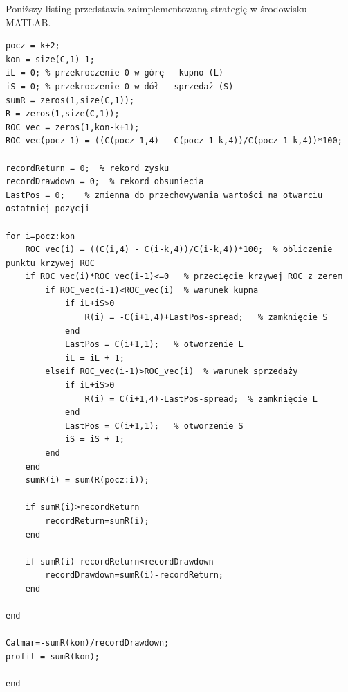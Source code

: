 \documentclass[12pt,a4paper]{article}
\begin{document}
\noindent Poniższy listing przedstawia zaimplementowaną strategię w środowisku MATLAB.
\begin{scriptsize}
\begin{lstlisting}
pocz = k+2;	
kon = size(C,1)-1;
iL = 0; % przekroczenie 0 w górę - kupno (L)
iS = 0; % przekroczenie 0 w dół - sprzedaż (S)
sumR = zeros(1,size(C,1));
R = zeros(1,size(C,1));
ROC_vec = zeros(1,kon-k+1);
ROC_vec(pocz-1) = ((C(pocz-1,4) - C(pocz-1-k,4))/C(pocz-1-k,4))*100;

recordReturn = 0;  % rekord zysku
recordDrawdown = 0;  % rekord obsuniecia
LastPos = 0;    % zmienna do przechowywania wartości na otwarciu ostatniej pozycji

for i=pocz:kon
    ROC_vec(i) = ((C(i,4) - C(i-k,4))/C(i-k,4))*100;  % obliczenie punktu krzywej ROC
    if ROC_vec(i)*ROC_vec(i-1)<=0   % przecięcie krzywej ROC z zerem
        if ROC_vec(i-1)<ROC_vec(i)  % warunek kupna
            if iL+iS>0
                R(i) = -C(i+1,4)+LastPos-spread;   % zamknięcie S
            end
            LastPos = C(i+1,1);   % otworzenie L
            iL = iL + 1;
        elseif ROC_vec(i-1)>ROC_vec(i)  % warunek sprzedaży
            if iL+iS>0
                R(i) = C(i+1,4)-LastPos-spread;  % zamknięcie L
            end
            LastPos = C(i+1,1);   % otworzenie S
            iS = iS + 1;
        end
    end
    sumR(i) = sum(R(pocz:i));
  
    if sumR(i)>recordReturn
        recordReturn=sumR(i);
    end
    
    if sumR(i)-recordReturn<recordDrawdown
        recordDrawdown=sumR(i)-recordReturn;  
    end

end

Calmar=-sumR(kon)/recordDrawdown;
profit = sumR(kon);

end
\end{lstlisting}
\end{scriptsize}
\end{document}
